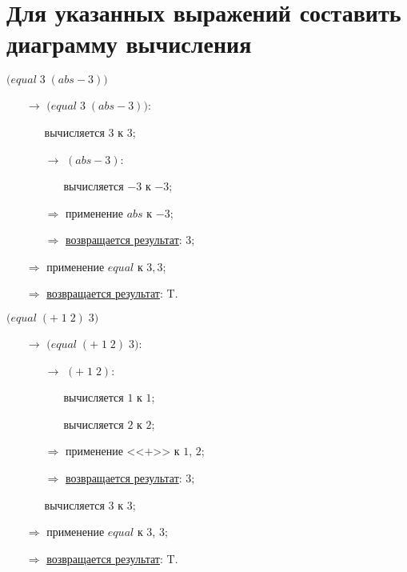 
\section{Для указанных выражений составить диаграмму вычисления}

\vfill
\problem $\bigl(equal\; 3\; (abs -\!3)\bigr)$

\begin{itemize}
	\item[$\longrightarrow$]$\bigl(equal\; 3\; (abs -\!3)\bigr)$:
	\begin{itemize}
		\item[\textbullet] вычисляется $3$ к $3$;
		\item[$\longrightarrow$] $(abs -\!3)$:
		\begin{itemize}
			\item[\textbullet] вычисляется $-3$ к $-3$;
		\end{itemize}
		\item[$\Longrightarrow$] применение $abs$ к $-3$;
		\item[$\Longrightarrow$] \underline{возвращается результат}: $3$;
	\end{itemize}
	\item[$\Longrightarrow$] применение $equal$ к $3, 3$;
	\item[$\Longrightarrow$] \underline{возвращается результат}: T.
\end{itemize}
\vfill


\problem $\bigl(equal\; (+\; 1\; 2)\; 3\bigr)$

\begin{itemize}
	\item[$\longrightarrow$] $\bigl(equal\; (+\; 1\; 2)\; 3\bigr)$:
	\begin{itemize}
		\item[$\longrightarrow$] $(+\; 1\; 2)$:
		\begin{itemize}
			\item[\textbullet] вычисляется $1$ к $1$;
			\item[\textbullet] вычисляется $2$ к $2$;
		\end{itemize}
		\item[$\Longrightarrow$] применение <<$+$>> к $1$, $2$;
		\item[$\Longrightarrow$] \underline{возвращается результат}: $3$;
		\item[\textbullet] вычисляется $3$ к $3$;
	\end{itemize}
	\item[$\Longrightarrow$] применение $equal$ к $3$, $3$;
	\item[$\Longrightarrow$] \underline{возвращается результат}: T.
\end{itemize}
\vfill


